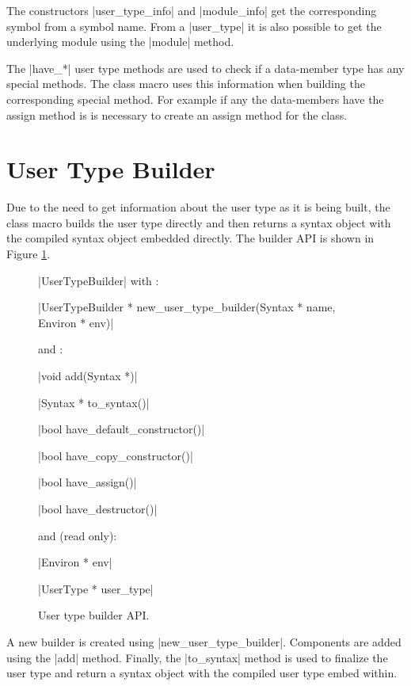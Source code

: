 The constructors |user_type_info| and |module_info| get the
corresponding symbol from a symbol name.  From a |user_type| it is also
possible to get the underlying module using the |module| method.

The |have_*| user type methods are used to check if a
data-member type has any special methods.  The class macro uses this
information when building the corresponding special method.  For
example if any the data-members have the assign method is is necessary
to create an assign method for the class.

\section{User Type Builder}

Due to the need to get information about the user type as it is being
built, the class macro builds the user type directly and then returns
a syntax object with the compiled syntax object embedded directly.
The builder API is shown in Figure \ref{builder-api}.

\begin{figure}
\begin{apil}
\item {} |UserTypeBuilder| with :
\begin{apill}
\item |UserTypeBuilder * new_user_type_builder(Syntax * name, Environ * env)|
\end{apill}
and :
\begin{apill}
\item |void add(Syntax *)|
\item |Syntax * to_syntax()|
\item |bool have_default_constructor()|
\item |bool have_copy_constructor()|
\item |bool have_assign()|
\item |bool have_destructor()|
\end{apill}
and  (read only):
\begin{apill}
\item |Environ * env|
\item |UserType * user_type|
\end{apill}
\end{apil}
\caption{User type builder API.}
\label{builder-api}
\end{figure}

A new builder is created using |new_user_type_builder|.  Components
are added using the |add| method.  Finally, the |to_syntax|
method is used to finalize the user type and return a syntax object
with the compiled user type embed within.

